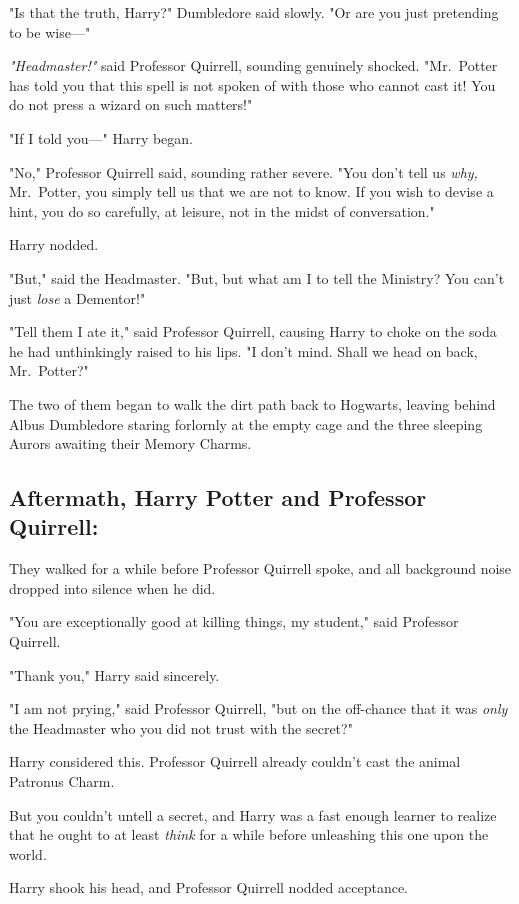 "Is that the truth, Harry?" Dumbledore said slowly. "Or are you just pretending
to be wise\mbox{---}"

\emph{"Headmaster!"} said Professor Quirrell, sounding genuinely shocked.
"Mr.~Potter has told you that this spell is not spoken of with those who cannot
cast it! You do not press a wizard on such matters!"

"If I told you\mbox{---}" Harry began.

"No," Professor Quirrell said, sounding rather severe. "You don't tell us
\emph{why,} Mr.~Potter, you simply tell us that we are not to know. If you wish
to devise a hint, you do so carefully, at leisure, not in the midst of
conversation."

Harry nodded.

"But," said the Headmaster. "But, but what am I to tell the Ministry? You can't
just \emph{lose} a Dementor!"

"Tell them I ate it," said Professor Quirrell, causing Harry to choke on the
soda he had unthinkingly raised to his lips. "I don't mind. Shall we head on
back, Mr.~Potter?"

The two of them began to walk the dirt path back to Hogwarts, leaving behind
Albus Dumbledore staring forlornly at the empty cage and the three sleeping
Aurors awaiting their Memory Charms.
\sbreak
\subsection{Aftermath, Harry Potter and Professor Quirrell:}

They walked for a while before Professor Quirrell spoke, and all background
noise dropped into silence when he did.

"You are exceptionally good at killing things, my student," said Professor
Quirrell.

"Thank you," Harry said sincerely.

"I am not prying," said Professor Quirrell, "but on the off-chance that it was
\emph{only} the Headmaster who you did not trust with the secret\el?"

Harry considered this. Professor Quirrell already couldn't cast the animal
Patronus Charm.

But you couldn't untell a secret, and Harry was a fast enough learner to
realize that he ought to at least \emph{think} for a while before unleashing
this one upon the world.

Harry shook his head, and Professor Quirrell nodded acceptance.

